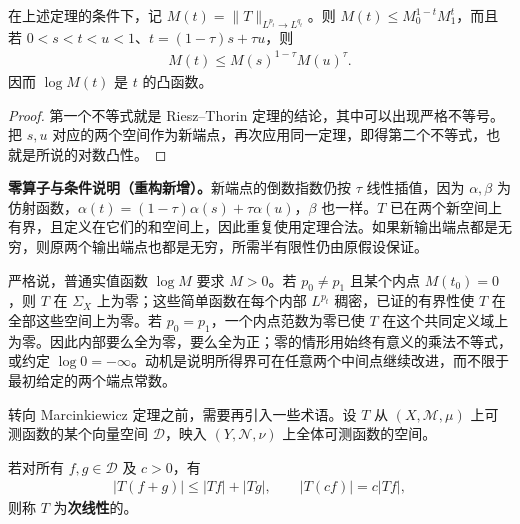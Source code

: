 \documentclass[../../main.tex]{subfiles}
\begin{document}
\begin{proposition}[插值算子范数的对数凸性]\label{proposition:ch06-interpolated-norm-log-convex}
在上述定理的条件下，记 $M(t)=\|T\|_{L^{p_t}\to L^{q_t}}$。则 $M(t)\leqslant M_0^{1-t}M_1^t$，而且若 $0<s<t<u<1$、$t=(1-\tau)s+\tau u$，则
\begin{align*}
M(t)\leqslant M(s)^{1-\tau}M(u)^\tau.
\end{align*}
因而 $\log M(t)$ 是 $t$ 的凸函数。
\end{proposition}
\begin{proof}
第一个不等式就是 Riesz–Thorin 定理的结论，其中可以出现严格不等号。把 $s,u$ 对应的两个空间作为新端点，再次应用同一定理，即得第二个不等式，也就是所说的对数凸性。
\end{proof}
\begin{remark}
\textbf{零算子与条件说明（重构新增）。}新端点的倒数指数仍按 $\tau$ 线性插值，因为 $\alpha,\beta$ 为仿射函数，$\alpha(t)=(1-\tau)\alpha(s)+\tau\alpha(u)$，$\beta$ 也一样。$T$ 已在两个新空间上有界，且定义在它们的和空间上，因此重复使用定理合法。如果新输出端点都是无穷，则原两个输出端点也都是无穷，所需半有限性仍由原假设保证。

严格说，普通实值函数 $\log M$ 要求 $M>0$。若 $p_0\ne p_1$ 且某个内点 $M(t_0)=0$，则 $T$ 在 $\Sigma_X$ 上为零；这些简单函数在每个内部 $L^{p_t}$ 稠密，已证的有界性使 $T$ 在全部这些空间上为零。若 $p_0=p_1$，一个内点范数为零已使 $T$ 在这个共同定义域上为零。因此内部要么全为零，要么全为正；零的情形用始终有意义的乘法不等式，或约定 $\log0=-\infty$。动机是说明所得界可在任意两个中间点继续改进，而不限于最初给定的两个端点常数。
\end{remark}
转向 Marcinkiewicz 定理之前，需要再引入一些术语。设 $T$ 从 $(X,\mathscr M,\mu)$ 上可测函数的某个向量空间 $\mathscr D$，映入 $(Y,\mathscr N,\nu)$ 上全体可测函数的空间。
\begin{definition}[次线性映射]\label{definition:ch06-sublinear}
若对所有 $f,g\in\mathscr D$ 及 $c>0$，有
\begin{align*}
|T(f+g)|\leqslant|Tf|+|Tg|,\qquad |T(cf)|=c|Tf|,
\end{align*}
则称 $T$ 为\textbf{次线性}的。
\end{definition}
\end{document}
